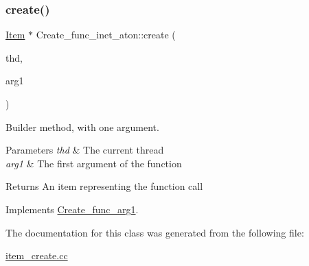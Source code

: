 \subsubsection{\texorpdfstring{create()}{create()}}
{\footnotesize\ttfamily \mbox{\hyperlink{classItem}{Item}} $\ast$ Create\+\_\+func\+\_\+inet\+\_\+aton\+::create (\begin{DoxyParamCaption}\item[{T\+HD $\ast$}]{thd,  }\item[{\mbox{\hyperlink{classItem}{Item}} $\ast$}]{arg1 }\end{DoxyParamCaption})\hspace{0.3cm}{\ttfamily [virtual]}}

Builder method, with one argument. 
\begin{DoxyParams}{Parameters}
{\em thd} & The current thread \\
\hline
{\em arg1} & The first argument of the function \\
\hline
\end{DoxyParams}
\begin{DoxyReturn}{Returns}
An item representing the function call 
\end{DoxyReturn}


Implements \mbox{\hyperlink{classCreate__func__arg1_a3e9a98f755cd82c3e762e334c955a8c9}{Create\+\_\+func\+\_\+arg1}}.



The documentation for this class was generated from the following file\+:\begin{DoxyCompactItemize}
\item 
\mbox{\hyperlink{item__create_8cc}{item\+\_\+create.\+cc}}\end{DoxyCompactItemize}
